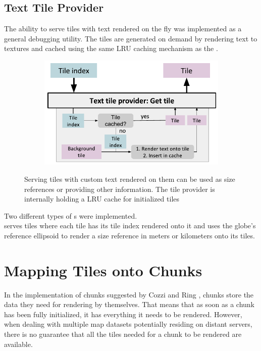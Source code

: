 \subsection{Text Tile Provider}
The ability to serve tiles with text rendered on the fly was implemented as a general debugging utility. The tiles are generated on demand by rendering text to textures and cached using the same LRU caching mechanism as the .

\begin{figure}[htbp]
    \centering
    \begin{subfigure}[bt]{0.6\textwidth}
        \includegraphics[width=\textwidth]{figures/implementation/tileprovider/texttileprovider_gettile.pdf}
    \end{subfigure}
    \caption{Serving tiles with custom text rendered on them can be used as size references or providing other information. The tile provider is internally holding a LRU cache for initialized tiles}
    \label{fig:texttileprovider_gettile}
\end{figure}

Two different types of s were implemented. \\  serves tiles where each tile has its tile index rendered onto it and  uses the globe's reference ellipsoid to render a size reference in meters or kilometers onto its tiles.


\section{Mapping Tiles onto Chunks}
  
In the implementation of chunks suggested by Cozzi and Ring \cite{cozzi11}, chunks store the data they need for rendering by themselves. That means that as soon as a chunk has been fully initialized, it has everything it needs to be rendered. However, when dealing with multiple map datasets potentially residing on distant servers, there is no guarantee that all the tiles needed for a chunk to be rendered are available.


